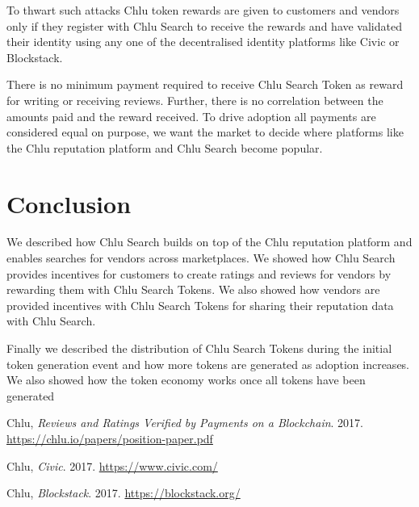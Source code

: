 \documentclass[a4paper]{article}
\begin{document}
To thwart such attacks Chlu token rewards are given to customers and
vendors only if they register with Chlu Search to receive the rewards
and have validated their identity using any one of the decentralised
identity platforms like Civic\cite{civic} or
Blockstack\cite{blockstack}.

There is no minimum payment required to receive Chlu Search Token as
reward for writing or receiving reviews. Further, there is no
correlation between the amounts paid and the reward received. To drive
adoption all payments are considered equal on purpose, we want the
market to decide where platforms like the Chlu reputation platform and
Chlu Search become popular.

\section{Conclusion}

We described how Chlu Search builds on top of the Chlu reputation
platform and enables searches for vendors across marketplaces. We
showed how Chlu Search provides incentives for customers to create
ratings and reviews for vendors by rewarding them with Chlu Search
Tokens. We also showed how vendors are provided incentives with Chlu
Search Tokens for sharing their reputation data with Chlu Search.

Finally we described the distribution of Chlu Search Tokens during the
initial token generation event and how more tokens are generated as
adoption increases. We also showed how the token economy works once
all tokens have been generated

\medskip
 
\printbibliography

\begin{thebibliography}{9}

 Chlu, \textit{Reviews and Ratings Verified
  by Payments on a Blockchain}. 2017.
  \url{https://chlu.io/papers/position-paper.pdf}

 Chlu, \textit{Civic}. 2017.
  \url{https://www.civic.com/}

 Chlu, \textit{Blockstack}. 2017.
  \url{https://blockstack.org/}
  
\end{thebibliography}
\end{document}
